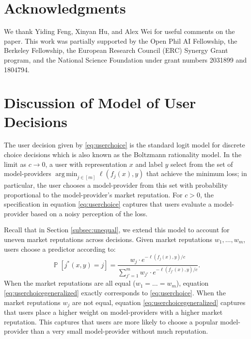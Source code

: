 \documentclass[letterpaper,11pt]{article}
\theoremstyle{plain}
\DeclareMathOperator*{\argmin}{arg\,min}
\DeclareMathOperator*{\Prob}{\mathbb{P}}
\begin{document}
\section{Acknowledgments}
We thank Yiding Feng, Xinyan Hu, and Alex Wei for useful comments on the paper. This work was partially supported by the Open Phil AI Fellowship, the Berkeley Fellowship, the European Research Council (ERC) Synergy Grant program, and the National Science Foundation under grant numbers 2031899 and 1804794. 

\printbibliography

\newpage 

\appendix

\section{Discussion of Model of User Decisions}\label{appendix:modeldiscussion}  


The user decision given by \eqref{eq:userchoice} is the standard logit model for discrete choice decisions \citep{train2002discrete} which is also known as the Boltzmann rationality model. In the limit as $c \rightarrow 0$, a user with representation $x$ and label $y$ select from the set of model-providers $\argmin_{j \in [m]} \ell(f_j(x), y)$ that achieve the minimum loss; in particular, the user chooses a model-provider from this set with probability proportional to the model-provider's market reputation. For $c > 0$, the specification in equation \eqref{eq:userchoice} captures that users evaluate a model-provider based on a noisy perception of the loss. 

Recall that in Section \ref{subsec:unequal}, 
we extend this model to account for uneven market reputations across decisions. Given market reputations $w_1, \ldots, w_m$, users choose a predictor according to: 
\begin{equation}
\label{eq:userchoicegeneralized}
\Prob[j^*(x,y) = j] = \frac{w_j \cdot e^{- \ell(f_j(x), y) / c}}{\sum_{j'=1}^m w_{j'} \cdot e^{- \ell(f_{j'}(x), y) / c}}.
\end{equation}
When the market reputations are all equal ($w_1 = \ldots = w_m$), equation \eqref{eq:userchoicegeneralized} exactly corresponds to \eqref{eq:userchoice}.  When the market reputations $w_j$ are not equal, equation \eqref{eq:userchoicegeneralized} captures that users place a higher weight on model-providers with a higher market reputation. This captures that users are more likely to choose a popular model-provider than a very small model-provider without much reputation. 
\end{document}
